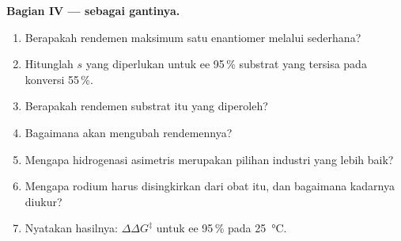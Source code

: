 \begin{problem}
\medskip\noindent\textbf{Bagian IV ---  sebagai gantinya.}
\begin{enumerate}[resume, beginpenalty=10000]
  \item Berapakah rendemen maksimum satu enantiomer melalui  sederhana?
  \item Hitunglah $s$ yang diperlukan untuk ee 95\,\% substrat yang tersisa pada konversi 55\,\%.
  \item Berapakah rendemen substrat itu yang diperoleh?
  \item Bagaimana  akan mengubah rendemennya?
  \item Mengapa hidrogenasi asimetris merupakan pilihan industri yang lebih baik?
  \item Mengapa rodium harus disingkirkan dari obat itu, dan bagaimana kadarnya diukur?
  \item Nyatakan hasilnya: $\Delta\Delta G^\ddagger$ untuk ee 95\,\% pada \qty{25}{\celsius}.
\end{enumerate}
\end{problem}
